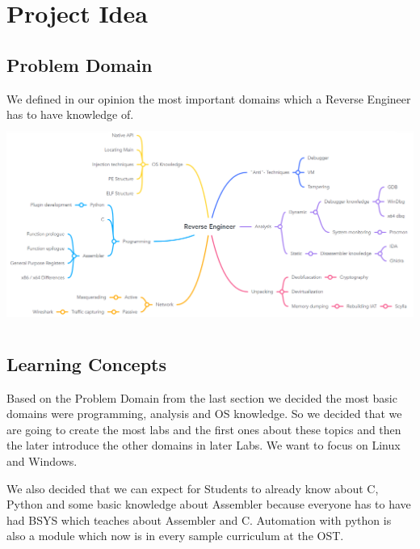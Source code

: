 \chapter{Project Idea}
\section{Problem Domain}
We defined in our opinion the most important domains which a Reverse Engineer has to have knowledge of. \\
\includegraphics[height=250px, center]{resources/ReverseEngineeringDomain.png}
\section{Learning Concepts}
Based on the Problem Domain from the last section we decided the most basic domains were programming, analysis and OS knowledge. So we decided that we are going to create the most labs and the first ones about these topics and then the later introduce the other domains in later Labs. We want to focus on Linux and Windows.

We also decided that we can expect for Students to already know about C, Python and some basic knowledge about Assembler because everyone has to have had BSYS which teaches about Assembler and C. Automation with python is also a module which now is in every sample curriculum at the OST.

